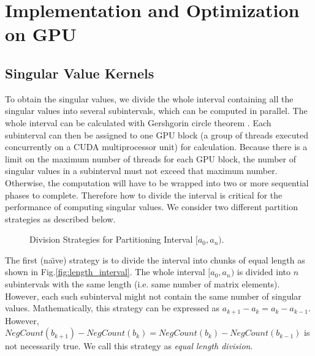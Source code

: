 \vspace{-0.1in}
\section{Implementation and Optimization on GPU} \label{sec:implementation}
\vspace{-0.1in}
\subsection{Singular Value Kernels} \label{sec_svalue}
\vspace{-0.1in}
To obtain the singular values, we divide the whole interval containing all the singular values into several subintervals, which can be computed in parallel. 
The whole interval can be calculated with Gershgorin circle theorem \cite{gershgorin}.
Each subinterval can then be assigned to one GPU block (a group of threads executed concurrently on a CUDA multiprocessor unit) for calculation.
Because there is a limit on the maximum number of threads for each GPU block,
the number of singular values in a subinterval must not exceed that maximum number. Otherwise, the computation will have to be wrapped into two or more sequential phases to complete.
Therefore how to divide the interval is critical for the performance of
computing singular values. We consider two different partition
strategies as described below. 
\begin{figure}[hbpt]
\vspace{-0.3in}
\centering
\vspace{-0.1in}
  \caption{Division Strategies for Partitioning Interval  $[a_0, a_n)$.}
\vspace{-0.3in}
\end{figure}

The first (na\"{\i}ve) strategy is to divide the interval into chunks of equal length as shown in Fig.\ref{fig:length_interval}.
The whole interval $[a_0, a_n)$ is divided into $n$ subintervals with
the same length (i.e. same number of matrix elements). However, each
such subinterval might not contain the same number of singular values.
Mathematically, this strategy can be expressed as
$a_{k+1}-a_k = a_{k}-a_{k-1}$. However, $NegCount(b_{k+1})-NegCount(b_{k}) = NegCount(b_{k})-NegCount(b_{k-1})$ is not necessarily true. We call this strategy as {\it equal length division}.

